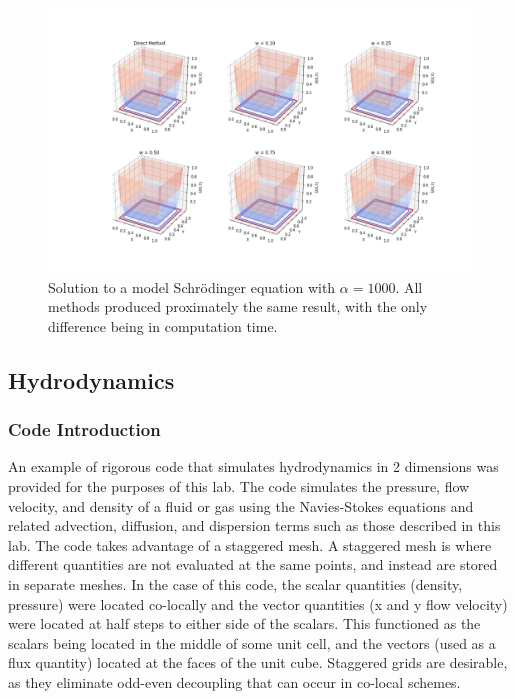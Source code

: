 \documentclass[twocolumn]{article}
\begin{document}
\begin{figure}
	\centering
	\includegraphics[width=\textwidth]{schroe_alpha_1000}
	\caption{Solution to a model Schr\"{o}dinger equation with $\alpha=1000$. All methods produced proximately the same result, with the only difference being in computation time.}
	\label{fig:schroe_alpha_1000}
\end{figure}

\subsection{Hydrodynamics}
\subsubsection{Code Introduction}

An example of rigorous code that simulates hydrodynamics in 2 dimensions was provided for the purposes of this lab. The code simulates the pressure, flow velocity, and density of a fluid or gas using the Navies-Stokes equations and related advection, diffusion, and dispersion terms such as those described in this lab. The code takes advantage of a staggered mesh. A staggered mesh is where different quantities are not evaluated at the same points, and instead are stored in separate meshes. In the case of this code, the scalar quantities (density, pressure) were located co-locally and the vector quantities (x and y flow velocity) were located at half steps to either side of the scalars. This functioned as the scalars being located in the middle of some unit cell, and the vectors (used as a flux quantity) located at the faces of the unit cube. Staggered grids are desirable, as they eliminate odd-even decoupling that can occur in co-local schemes.
\end{document}
